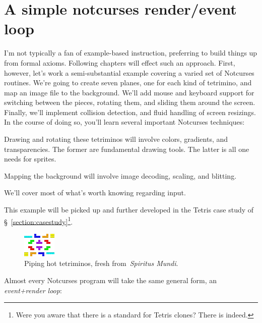 \section{A simple notcurses render\slash event loop}
I'm not typically a fan of example-based instruction, preferring to build things
up from formal axioms. Following chapters will effect such an approach. First,
however, let's work a semi-substantial example covering a varied set of
Notcurses routines. We're going to create seven planes, one for each kind
of tetrimino, and map an image file to the background. We'll add mouse and
keyboard support for switching between the pieces, rotating them, and sliding
them around the screen. Finally, we'll implement collision detection, and
fluid handling of screen resizings. In the course of doing so, you'll learn
several important Notcurses techniques:

\begin{denseitemize}
\item{Drawing and rotating these tetriminos will involve colors, gradients, and
      transparencies. The former are fundamental drawing tools. The latter is
      all one needs for sprites.}
\item{Mapping the background will involve image decoding, scaling, and blitting.}
\item{We'll cover most of what's worth knowing regarding input.}
\end{denseitemize}

This example will be picked up and further developed in the Tetris case study
of §~\ref{section:casestudy}\footnote{Were you aware that there is a standard
for Tetris clones? There is indeed\cite{tetris}.}.

\begin{figure}[!htbp]
\centering \includegraphics[width=.5\linewidth]{media/tetriminos.png}
\caption{Piping hot tetriminos, fresh from~\textit{Spiritus Mundi}.}
\label{fig:tetriminos}
\end{figure}

Almost every Notcurses program will take the same general form, an \textit{event+render loop}:

